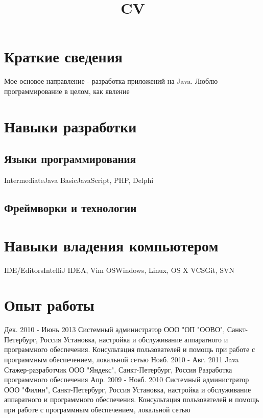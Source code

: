 \documentclass[11pt,a4paper,russian]{moderncv}
\title{CV}
\begin{document}
\maketitle

\section{Краткие сведения}
\cvline
  {}
  {Мое основое направление - разработка приложений на Java. \newline{} 
  Люблю программирование в целом, как явление}
  
\section{Навыки разработки}
\subsection{Языки программирования}
\cvline
  {Intermediate}{Java}
\cvline
  {Basic}{JavaScript, PHP, Delphi}
\subsection{Фреймворки и технологии}

\section{Навыки владения компьютером}
\cvline
  {IDE/Editors}{IntelliJ IDEA, Vim}
\cvline
  {OS}{Windows, Linux, OS X}
\cvline
  {VCS}{Git, SVN}
  
\section{Опыт работы}
\cventry
  {Дек. 2010 - Июнь 2013}
  {Системный администратор}
  {ООО "ОП "ООВО", Санкт-Петербург, Россия}
  {}{}
  {Установка, настройка и обслуживание аппаратного и программного обеспечения. 
  \newline{}Консультация пользователей и помощь при работе с программным обеспечением, локальной сетью}
\cventry
  {Нояб. 2010 - Авг. 2011}
  {Java Стажер-разработчик}
  {ООО "Яндекс", Санкт-Петербург, Россия}
  {}{}
  {Разработка программного обеспечения}
\cventry
  {Апр. 2009 - Нояб. 2010}
  {Системный администратор}
  {ООО "Филин", Санкт-Петербург, Россия}
  {}{}
  {Установка, настройка и обслуживание аппаратного и программного обеспечения. 
  \newline{}Консультация пользователей и помощь при работе с программным обеспечением, локальной сетью}  
  
\end{document}
